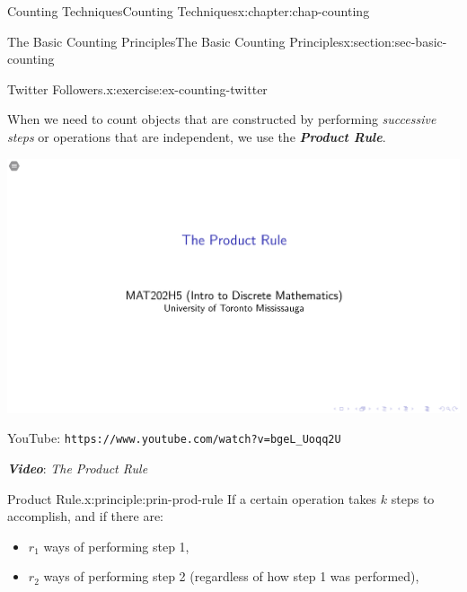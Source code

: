 \documentclass[oneside,10pt,]{book}
\newcommand{\mono}[1]{\texttt{#1}}
\newcommand{\alert}[1]{\textbf{\textit{#1}}}
\numberwithin{equation}{section}
\newlength{\qrsize}
\newlength{\previewwidth}
\begin{document}
\begin{chapterptx}{Counting Techniques}{}{Counting Techniques}{}{}{x:chapter:chap-counting}
\begin{sectionptx}{The Basic Counting Principles}{}{The Basic Counting Principles}{}{}{x:section:sec-basic-counting}
\begin{inlineexercise}{Twitter Followers.}{x:exercise:ex-counting-twitter}
\end{inlineexercise}
When we need to count objects that are constructed by performing \emph{successive steps} or operations that are independent, we use the \alert{Product Rule}.%
\begin{sidebyside}{1}{0}{0}{0}%
\begin{sbspanel}{1}%
\setlength{\qrsize}{9em}
\setlength{\previewwidth}{\linewidth}
\addtolength{\previewwidth}{-\qrsize}
\begin{tcbraster}[raster columns=2, raster column skip=1pt, raster halign=center, raster force size=false, raster left skip=0pt, raster right skip=0pt]%
\begin{tcolorbox}[previewstyle, width=\previewwidth]%
\includegraphics[width=0.80\linewidth,height=\qrsize,keepaspectratio]{images/03-thumb.png}%
\end{tcolorbox}%
\begin{tcolorbox}[qrstyle]%
{\hypersetup{urlcolor=black}}%
\end{tcolorbox}%
\begin{tcolorbox}[captionstyle]%
\small YouTube: \mono{https://www.youtube.com/watch?v=bgeL\_Uoqq2U}\end{tcolorbox}%
\end{tcbraster}%
\end{sbspanel}%
\end{sidebyside}%
\par
\alert{Video}: \emph{The Product Rule}%
\begin{principle}{Product Rule.}{}{x:principle:prin-prod-rule}%
If a certain operation takes \(k\) steps to accomplish, and if there are:%
\begin{itemize}[label=\textbullet]
\item{}\(r_1\) ways of performing step 1,%
\item{}\(r_2\) ways of performing step 2 (regardless of how step 1 was performed),%

\end{itemize}
\end{principle}
\end{sectionptx}
\end{chapterptx}
\end{document}
